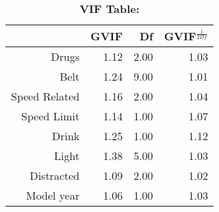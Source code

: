 \begin{table}[ht]
\centering
\caption{\textbf{VIF Table:}}
\begin{tabular}{rrrr}
  \hline
 & GVIF & Df & GVIF$^{\frac{1}{2Df}}$ \\ 
  \hline
Drugs & 1.12 & 2.00 & 1.03 \\ 
  Belt & 1.24 & 9.00 & 1.01 \\ 
  Speed Related & 1.16 & 2.00 & 1.04 \\ 
  Speed Limit & 1.14 & 1.00 & 1.07 \\ 
  Drink & 1.25 & 1.00 & 1.12 \\ 
  Light & 1.38 & 5.00 & 1.03 \\ 
  Distracted & 1.09 & 2.00 & 1.02 \\ 
  Model year & 1.06 & 1.00 & 1.03 \\ 
   \hline
\end{tabular}
\end{table}
